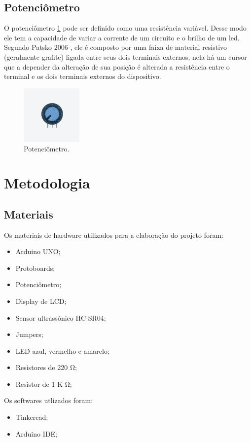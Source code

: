 \documentclass[conference]{IEEEtran}
\begin{document}
\subsection{Potenciômetro}
O potenciômetro \ref{fig:potenciometro} pode ser definido como uma resistência variável. Desse modo ele tem a capacidade de variar a corrente de um circuito e o brilho
de um led. Segundo Patsko 2006  \cite{patsko2006}, ele é composto por uma faixa de material resistivo (geralmente grafite) ligada entre seus dois terminais externos,
nela há um cursor que a depender da alteração de sua posição é alterada a resistência entre o terminal e os dois terminais externos do dispositivo.

\begin{figure}[htbp]
    \centerline{
        \includegraphics[width=3cm]{images/potenciometro.png}
    }
    \caption{Potenciômetro.}
    \label{fig:potenciometro}
\end{figure}

\section{Metodologia}

\subsection{Materiais}
Os materiais de hardware utilizados para a elaboração do projeto foram:
\begin{itemize}
    \item Arduino UNO;
    \item Protoboards;
    \item Potenciômetro;
    \item Display de LCD;
    \item Sensor ultrassônico HC-SR04;
    \item Jumpers;
    \item LED azul, vermelho e amarelo;
    \item Resistores de 220 \si{\ohm};
    \item Resistor de 1 K \si{\ohm};
\end{itemize}
Os softwares utlizados foram:
\begin{itemize}
    \item Tinkercad;
    \item Arduino IDE;
\end{itemize}
\end{document}
